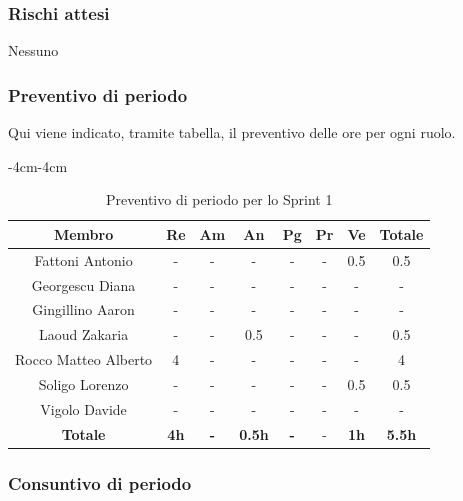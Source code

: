 \documentclass[a4paper,12pt]{article}
\begin{document}
\subsubsection{Rischi attesi}
Nessuno

\subsubsection{Preventivo di periodo}
Qui viene indicato, tramite tabella, il preventivo delle ore per ogni ruolo.
\begin{table}[H]
    \begin{adjustwidth}{-4cm}{-4cm}
    \centering
    \begin{tabular}{|c|c|c|c|c|c|c|c|}
        \hline
        \textbf{Membro}& \textbf{Re} & \textbf{Am} & \textbf{An} & \textbf{Pg} & \textbf{Pr} & \textbf{Ve} & \textbf{Totale} \\
        \hline
        Fattoni Antonio & - & - & - & - & - & 0.5& 0.5\\
        \hline
        Georgescu Diana& - & - & - & - & - & - & - \\
        \hline
        Gingillino Aaron& - & - & - & - & - & - & - \\
        \hline
        Laoud Zakaria& - & - & 0.5& - & - & - & 0.5\\
        \hline
        Rocco Matteo Alberto& 4& -& -& -& -& -&4\\
        \hline
        Soligo Lorenzo& -& -& -& -& -& 0.5&0.5\\
        \hline
        Vigolo Davide& -& -& -& -& -& -&-\\
        \hline
        \textbf{Totale} & \textbf{4h}& \textbf{-} & \textbf{0.5h}& \textbf{-}& -& \textbf{1h}& \textbf{5.5h}\\
        \hline
    \end{tabular}
    \caption{Preventivo di periodo per lo Sprint 1}
    \end{adjustwidth}
\end{table}


\subsubsection{Consuntivo di periodo}
\end{document}
